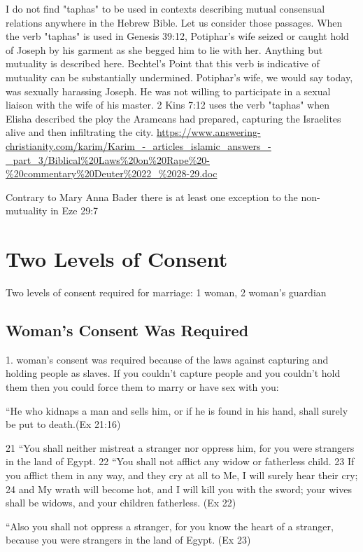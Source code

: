 \documentclass[11pt]{article}
\begin{document}
	 	 	

I do not find "taphas" to be used in contexts describing mutual consensual relations anywhere in the Hebrew Bible. Let us consider those passages. When the verb "taphas" is used in Genesis 39:12, Potiphar's wife seized or caught hold of Joseph by his garment as she begged him to lie with her. Anything but mutuality is described here. Bechtel's Point that this verb is indicative of mutuality can be substantially undermined. Potiphar's wife, we would say today, was sexually harassing Joseph. He was not willing to participate in a sexual liaison with the wife of his master. 2 Kins 7:12 uses the verb "taphas" when Elisha described the ploy the Arameans had prepared, capturing the Israelites alive and then infiltrating the city. 
\url{https://www.answering-christianity.com/karim/Karim_-_articles_islamic_answers_-_part_3/Biblical%20Laws%20on%20Rape%20-%20commentary%20Deuter%2022_%2028-29.doc}


Contrary to Mary Anna Bader there is at least one exception to the non-mutuality in Eze 29:7


\section{Two Levels of Consent}
Two levels of consent required for marriage: 1 woman, 2 woman’s guardian

\subsection{Woman's Consent Was Required}

1. woman’s consent was required because of the laws against capturing and holding people as slaves. If you couldn’t capture people and you couldn’t hold them then you could force them to marry or have sex with you:

 “He who kidnaps a man and sells him, or if he is found in his hand, shall surely be put to death.(Ex 21:16)


21 “You shall neither mistreat a stranger nor oppress him, for you were strangers in the land of Egypt.
22 “You shall not afflict any widow or fatherless child. 23 If you afflict them in any way, and they cry at all to Me, I will surely hear their cry; 24 and My wrath will become hot, and I will kill you with the sword; your wives shall be widows, and your children fatherless. (Ex 22)


“Also you shall not oppress a stranger, for you know the heart of a stranger, because you were strangers in the land of Egypt. (Ex 23)
\end{document}
